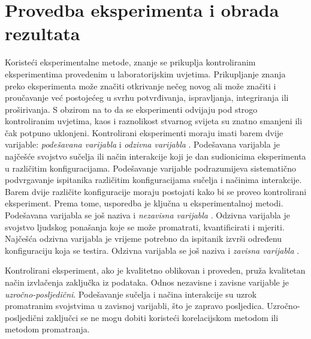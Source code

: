\documentclass[times, utf8, zavrsni, numeric]{fer}
\begin{document}
\chapter{Provedba eksperimenta i obrada rezultata}
\label{ch:eksperiment}
Koristeći eksperimentalne metode, znanje se prikuplja kontroliranim eksperimentima provedenim u laboratorijskim uvjetima. Prikupljanje znanja preko eksperimenta može značiti otkrivanje nečeg novog ali može značiti i proučavanje već postojećeg u svrhu potvrđivanja, ispravljanja, integriranja ili proširivanja. S obzirom na to da se eksperimenti odvijaju pod strogo kontroliranim uvjetima, kaos i raznolikost stvarnog svijeta su znatno smanjeni ili čak potpuno uklonjeni. Kontrolirani eksperimenti moraju imati barem dvije varijable: \emph{podešavana varijabla}  i \emph{odzivna varijabla} . Podešavana varijabla je najčešće svojstvo sučelja ili način interakcije koji je dan sudionicima eksperimenta u različitim konfiguracijama. Podešavanje varijable podrazumijeva sistematično podvrgavanje ispitanika različitim konfiguracijama sučelja i načinima interakcije. Barem dvije različite konfiguracije moraju postojati kako bi se proveo kontrolirani eksperiment. Prema tome, usporedba je ključna u eksperimentalnoj metodi. Podešavana varijabla se još naziva i \emph{nezavisna varijabla} . Odzivna varijabla je svojstvo ljudskog ponašanja koje se može promatrati, kvantificirati i mjeriti. Najčešća odzivna varijabla je vrijeme potrebno da ispitanik izvrši određenu konfiguraciju koja se testira. Odzivna varijabla se još naziva i \emph{zavisna varijabla} .

Kontrolirani eksperiment, ako je kvalitetno oblikovan i proveden, pruža kvalitetan način izvlačenja zaključka iz podataka. Odnos nezavisne i zavisne varijable je \emph{uzročno-posljedični}. Podešavanje sučelja i načina interakcije su uzrok promatranim svojstvima u zavisnoj varijabli, što je zapravo posljedica. Uzročno-posljedični zaključci se ne mogu dobiti koristeći korelacijskom metodom ili metodom promatranja.
\end{document}
